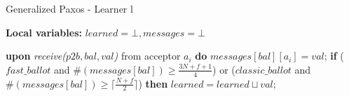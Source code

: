 \begin{algorithm}
	\caption{Generalized Paxos - Learner l}
	\textbf{Local variables: } $learned = \bot, messages = \bot$ 
	\begin{algorithmic}[1]
		\State \textbf{upon} \textit{receive($p2b, bal, val$)} from acceptor $a_i$ \textbf{do}
		\State \hspace{\algorithmicindent} $messages[bal][a_i] = val$;
		\State \hspace{\algorithmicindent} \textbf{if} {($fast\_ballot$ and $\#(messages[bal]) \geq \frac{3N+f+1}{4}$) or
			\State \hspace{\algorithmicindent} \hspace{\algorithmicindent}	($classic\_ballot$ and $\#(messages[bal]) \geq \lceil \frac{N+f}{2}\rceil$)} \textbf{then}
		\State \hspace{\algorithmicindent} \hspace{\algorithmicindent} \hspace{\algorithmicindent} $learned = learned \sqcup val$;
	\end{algorithmic}
\end{algorithm}
